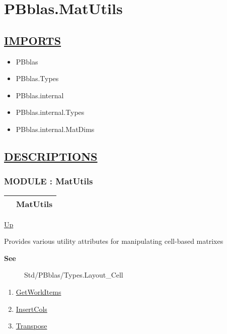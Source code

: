 \chapter*{PBblas.MatUtils}
\hypertarget{ecldoc:toc:PBblas.MatUtils}{}

\section*{\underline{IMPORTS}}
\begin{itemize}
\item PBblas
\item PBblas.Types
\item PBblas.internal
\item PBblas.internal.Types
\item PBblas.internal.MatDims
\end{itemize}

\section*{\underline{DESCRIPTIONS}}
\subsection*{MODULE : MatUtils}
\hypertarget{ecldoc:PBblas.MatUtils}{}

{\renewcommand{\arraystretch}{1.5}
\begin{tabularx}{\textwidth}{|>{\raggedright\arraybackslash}l|X|}
\hline
\hspace{0pt} & MatUtils \\
\hline
\end{tabularx}
}

\hyperlink{ecldoc:toc:PBblas}{Up}

\par
Provides various utility attributes for manipulating cell-based matrixes

\par
\begin{description}
\item [\textbf{See}] Std/PBblas/Types.Layout\_Cell
\end{description}

\begin{enumerate}
\item \hyperlink{ecldoc:pbblas.matutils.getworkitems}{GetWorkItems}
\item \hyperlink{ecldoc:pbblas.matutils.insertcols}{InsertCols}
\item \hyperlink{ecldoc:pbblas.matutils.transpose}{Transpose}
\end{enumerate}

